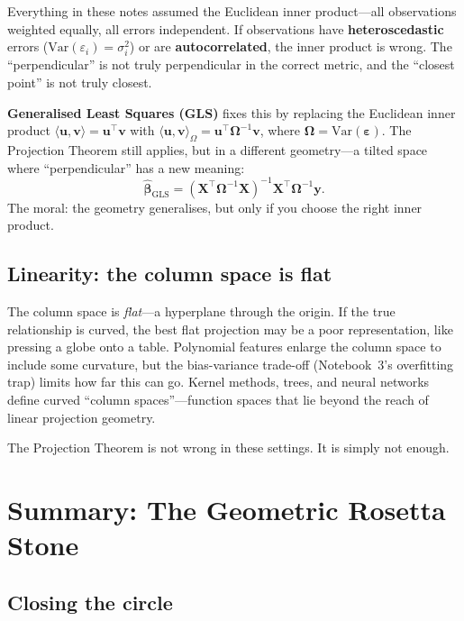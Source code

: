 \documentclass[11pt,a4paper]{article}
\theoremstyle{plain}
\theoremstyle{definition}
\newcommand{\bhat}{\hat{\bm{\beta}}}
\newcommand{\bX}{\bm{X}}
\newcommand{\by}{\bm{y}}
\newcommand{\ip}[2]{\langle #1, #2 \rangle}
\begin{document}
Everything in these notes assumed the Euclidean inner product---all
observations weighted equally, all errors independent.
If observations have \textbf{heteroscedastic} errors
($\text{Var}(\varepsilon_i) = \sigma_i^2$) or are
\textbf{autocorrelated},
the inner product is wrong.
The ``perpendicular'' is not truly perpendicular in the correct metric,
and the ``closest point'' is not truly closest.

\textbf{Generalised Least Squares (GLS)} fixes this by replacing the
Euclidean inner product $\ip{\bm{u}}{\bm{v}}=\bm{u}^\top\bm{v}$ with
$\ip{\bm{u}}{\bm{v}}_\Omega = \bm{u}^\top\bm{\Omega}^{-1}\bm{v}$,
where $\bm{\Omega} = \text{Var}(\bm{\varepsilon})$.
The Projection Theorem still applies, but in a different geometry---a
tilted space where ``perpendicular'' has a new meaning:
\[
  \bhat_{\text{GLS}}
  = (\bX^\top\bm{\Omega}^{-1}\bX)^{-1}\bX^\top\bm{\Omega}^{-1}\by.
\]
The moral: the geometry generalises, but only if you choose the right
inner product.

\subsection{Linearity: the column space is flat}

The column space is \emph{flat}---a hyperplane through the origin.
If the true relationship is curved, the best flat projection may be
a poor representation, like pressing a globe onto a table.
Polynomial features enlarge the column space to include some curvature,
but the bias-variance trade-off (Notebook~3's overfitting trap) limits
how far this can go.
Kernel methods, trees, and neural networks define curved ``column
spaces''---function spaces that lie beyond the reach of linear
projection geometry.

The Projection Theorem is not wrong in these settings.  It is simply
not enough.


\section{Summary: The Geometric Rosetta Stone}\label{sec:rosetta}

\subsection*{Closing the circle}
\end{document}
